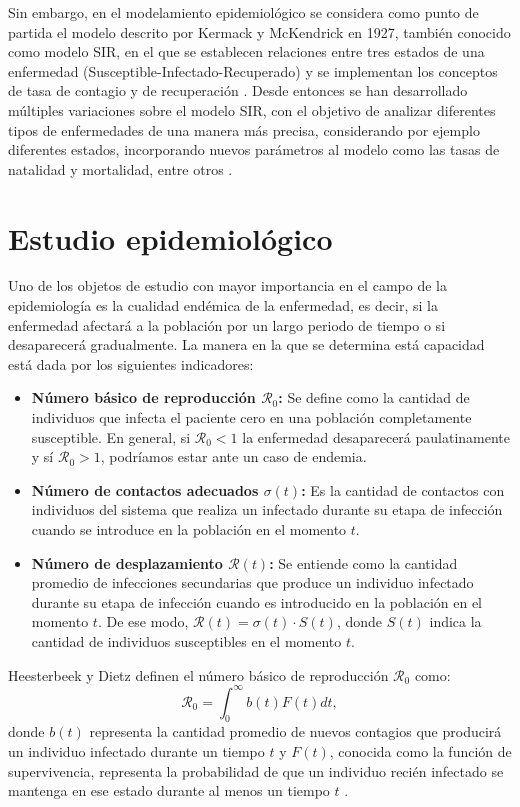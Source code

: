 Sin embargo, en el modelamiento epidemiológico se considera como punto de partida el modelo descrito por Kermack y McKendrick en 1927, también conocido como modelo SIR, en el que se establecen relaciones entre tres estados de una enfermedad (Susceptible-Infectado-Recuperado) y se implementan los conceptos de tasa de contagio y de recuperación \cite{malariaSIR}. Desde entonces se han desarrollado múltiples variaciones sobre el modelo SIR, con el objetivo de analizar diferentes tipos de enfermedades de una manera más precisa, considerando por ejemplo diferentes estados, incorporando nuevos parámetros al modelo como las tasas de natalidad y mortalidad, entre otros \cite{diego2010}.

\section{Estudio epidemiológico}\label{sec:EstudioEpidemiológico}
Uno de los objetos de estudio con mayor importancia en el campo de la epidemiología es la cualidad endémica de la enfermedad, es decir, si la enfermedad afectará a la población por un largo periodo de tiempo o si desaparecerá gradualmente. La manera en la que se determina está capacidad está dada por los siguientes indicadores:

\begin{itemize}
    \item \textbf{Número básico de reproducción $\mathcal{R}_0$:} Se define como la cantidad de individuos que infecta el paciente cero en una población completamente susceptible. En general, si $\mathcal{R}_0<1$ la enfermedad desaparecerá paulatinamente y sí $\mathcal{R}_0>1$, podríamos estar ante un caso de endemia.
    \item \textbf{Número de contactos adecuados $\sigma(t)$:} Es la cantidad de contactos con individuos del sistema que realiza un infectado durante su etapa de infección cuando se introduce en la población en el momento $t$.
    \item \textbf{Número de desplazamiento $\mathcal{R}(t)$:} Se entiende como la cantidad promedio de infecciones secundarias que produce un individuo infectado durante su etapa de infección cuando es introducido en la población en el momento $t$. De ese modo, $\mathcal{R}(t) = \sigma(t)\cdot S(t)$, donde $S(t)$ indica la cantidad de individuos susceptibles en el momento $t$.
\end{itemize}

Heesterbeek y Dietz definen el número básico de reproducción $\mathcal{R}_0$ como:
\begin{equation}\label{eq:R0}
    \mathcal{R}_0 = \int_0^\infty b(t)F(t) dt,
\end{equation}
donde $b(t)$ representa la cantidad promedio de nuevos contagios que producirá un individuo infectado durante un tiempo $t$ y $F(t)$, conocida como la función de supervivencia, representa la probabilidad de que un individuo recién infectado se mantenga en ese estado durante al menos un tiempo $t$ \cite{conceptOfR0, perspectivesOnR0}.

